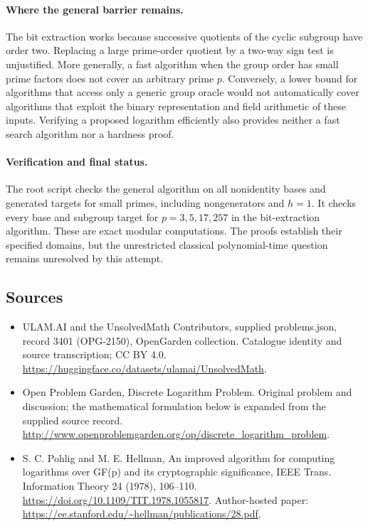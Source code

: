 \documentclass[11pt,a4paper]{article}
\begin{document}
\paragraph{Where the general barrier remains.}
The bit extraction works because successive quotients
of the cyclic subgroup have order two. Replacing a
large prime-order quotient by a two-way sign test is
unjustified. More generally, a fast algorithm when
the group order has small prime factors does not
cover an arbitrary prime $p$. Conversely, a lower
bound for algorithms that access only a generic
group oracle would not automatically cover algorithms
that exploit the binary representation and field
arithmetic of these inputs. Verifying a proposed
logarithm efficiently also provides neither a fast
search algorithm nor a hardness proof.

\paragraph{Verification and final status.}
The root script checks the general algorithm on
all nonidentity bases and generated targets for
small primes, including nongenerators and $h=1$.
It checks every base and subgroup target for
$p=3,5,17,257$ in the bit-extraction algorithm.
These are exact modular computations. The proofs
establish their specified domains, but the unrestricted
classical polynomial-time question remains unresolved
by this attempt.

\subsection{Sources}
\begin{itemize}
\item[S1] ULAM.AI and the UnsolvedMath Contributors, supplied problems.json, record 3401 (OPG-2150), OpenGarden collection. Catalogue identity and source transcription; CC BY 4.0.
\url{https://huggingface.co/datasets/ulamai/UnsolvedMath}.
\item[S2] Open Problem Garden, Discrete Logarithm Problem. Original problem and discussion; the mathematical formulation below is expanded from the supplied source record.
\url{http://www.openproblemgarden.org/op/discrete_logarithm_problem}.

\item[R1] S. C. Pohlig and M. E. Hellman, An improved algorithm for
computing logarithms over GF(p) and its cryptographic significance,
IEEE Trans. Information Theory 24 (1978), 106--110.
\url{https://doi.org/10.1109/TIT.1978.1055817}.
Author-hosted paper: \url{https://ee.stanford.edu/~hellman/publications/28.pdf}.

\end{itemize}
\end{document}
